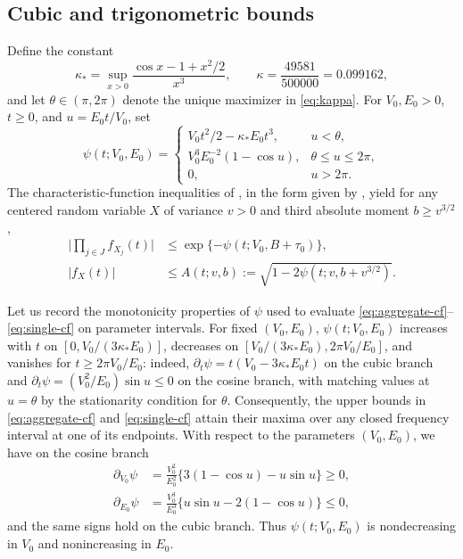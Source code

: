 \documentclass[11pt]{article}
\numberwithin{equation}{section}
\theoremstyle{remark}
\begin{document}
\subsection{Cubic and trigonometric bounds}

Define the constant
\begin{equation}\label{eq:kappa}
 \kappa_* = \sup_{x>0}\frac{\cos x-1+x^2/2}{x^3},
 \qquad \kappa=\frac{49581}{500000}=0.099162,
\end{equation}
and let $\theta\in(\pi,2\pi)$ denote the unique maximizer in
\eqref{eq:kappa}. For $V_0,E_0>0$, $t\ge0$, and $u=E_0t/V_0$, set
\begin{equation}\label{eq:tyurin-exponent}
 \psi(t;V_0,E_0)=
 \begin{cases}
   V_0t^2/2-\kappa_*E_0t^3,&u<\theta,\\
   V_0^3E_0^{-2}(1-\cos u),&\theta\le u\le2\pi,\\
   0,&u>2\pi.
 \end{cases}
\end{equation}
The characteristic-function inequalities of \citet{Prawitz1975}, in the form
given by \citet[Lemma~1]{Tyurin2009}, yield for any centered random variable
$X$ of variance $v>0$ and third absolute moment $b\ge v^{3/2}$,
\begin{align}
 \Big|\prod_{j\in J} f_{X_j}(t)\Big|
   &\le \exp\{-\psi(t;V_0,B+\tau_0)\},\label{eq:aggregate-cf}\\
 |f_X(t)|&\le A(t;v,b)
   :=\sqrt{1-2\psi(t;v,b+v^{3/2})}.\label{eq:single-cf}
\end{align}

Let us record the monotonicity properties of $\psi$ used to evaluate
\eqref{eq:aggregate-cf}--\eqref{eq:single-cf} on parameter intervals. For fixed
$(V_0,E_0)$, $\psi(t;V_0,E_0)$ increases with $t$ on $[0,V_0/(3\kappa_*E_0)]$,
decreases on $[V_0/(3\kappa_*E_0),2\pi V_0/E_0]$, and vanishes for
$t\ge2\pi V_0/E_0$: indeed, $\partial_t\psi=t(V_0-3\kappa_*E_0t)$ on the
cubic branch and $\partial_t\psi=(V_0^2/E_0)\sin u\le0$ on the cosine
branch, with matching values at $u=\theta$ by the stationarity condition for
$\theta$. Consequently, the upper bounds in \eqref{eq:aggregate-cf} and
\eqref{eq:single-cf} attain their maxima over any closed frequency interval
at one of its endpoints. With respect to the parameters $(V_0,E_0)$, we have
on the cosine branch
\begin{align*}
 \partial_{V_0}\psi
 &=\frac{V_0^2}{E_0^2}\{3(1-\cos u)-u\sin u\}\ge0,\\
 \partial_{E_0}\psi
 &=\frac{V_0^3}{E_0^3}\{u\sin u-2(1-\cos u)\}\le0,
\end{align*}
and the same signs hold on the cubic branch. Thus $\psi(t;V_0,E_0)$ is
nondecreasing in $V_0$ and nonincreasing in $E_0$.
\end{document}
